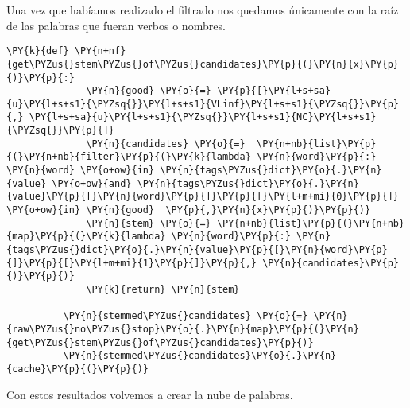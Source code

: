              Una vez que habíamos realizado el filtrado nos quedamos únicamente con la raíz de las palabras que fueran
          verbos o nombres.
          
          \vspace{0.5cm}
          
              \begin{tcolorbox}[breakable, size=fbox, boxrule=1pt, pad at break*=1mm,colback=cellbackground, colframe=cellborder]
          \begin{Verbatim}[commandchars=\\\{\}]
          \PY{k}{def} \PY{n+nf}{get\PYZus{}stem\PYZus{}of\PYZus{}candidates}\PY{p}{(}\PY{n}{x}\PY{p}{)}\PY{p}{:}
              \PY{n}{good} \PY{o}{=} \PY{p}{[}\PY{l+s+sa}{u}\PY{l+s+s1}{\PYZsq{}}\PY{l+s+s1}{VLinf}\PY{l+s+s1}{\PYZsq{}}\PY{p}{,} \PY{l+s+sa}{u}\PY{l+s+s1}{\PYZsq{}}\PY{l+s+s1}{NC}\PY{l+s+s1}{\PYZsq{}}\PY{p}{]}
              \PY{n}{candidates} \PY{o}{=}  \PY{n+nb}{list}\PY{p}{(}\PY{n+nb}{filter}\PY{p}{(}\PY{k}{lambda} \PY{n}{word}\PY{p}{:} \PY{n}{word} \PY{o+ow}{in} \PY{n}{tags\PYZus{}dict}\PY{o}{.}\PY{n}{value} \PY{o+ow}{and} \PY{n}{tags\PYZus{}dict}\PY{o}{.}\PY{n}{value}\PY{p}{[}\PY{n}{word}\PY{p}{]}\PY{p}{[}\PY{l+m+mi}{0}\PY{p}{]} \PY{o+ow}{in} \PY{n}{good}  \PY{p}{,}\PY{n}{x}\PY{p}{)}\PY{p}{)}
              \PY{n}{stem} \PY{o}{=} \PY{n+nb}{list}\PY{p}{(}\PY{n+nb}{map}\PY{p}{(}\PY{k}{lambda} \PY{n}{word}\PY{p}{:} \PY{n}{tags\PYZus{}dict}\PY{o}{.}\PY{n}{value}\PY{p}{[}\PY{n}{word}\PY{p}{]}\PY{p}{[}\PY{l+m+mi}{1}\PY{p}{]}\PY{p}{,} \PY{n}{candidates}\PY{p}{)}\PY{p}{)}
              \PY{k}{return} \PY{n}{stem}
              
          \PY{n}{stemmed\PYZus{}candidates} \PY{o}{=} \PY{n}{raw\PYZus{}no\PYZus{}stop}\PY{o}{.}\PY{n}{map}\PY{p}{(}\PY{n}{get\PYZus{}stem\PYZus{}of\PYZus{}candidates}\PY{p}{)}    
          \PY{n}{stemmed\PYZus{}candidates}\PY{o}{.}\PY{n}{cache}\PY{p}{(}\PY{p}{)}
          \end{Verbatim}
          \end{tcolorbox}
         
         Con estos resultados volvemos a crear la nube de palabras.  
         
         \vspace{0.5cm}

